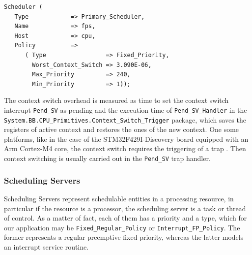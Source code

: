 \documentclass{article}
\begin{document}
\begin{lstlisting}
Scheduler (
   Type            => Primary_Scheduler,
   Name            => fps,
   Host            => cpu,
   Policy          =>
      ( Type                 => Fixed_Priority,
        Worst_Context_Switch => 3.090E-06,
        Max_Priority         => 240,
        Min_Priority         => 1));
\end{lstlisting}

The context switch overhead is measured as time to set the context switch interrupt \texttt{Pend\_SV} as pending and the execution time of \texttt{Pend\_SV\_Handler} in the \texttt{System.BB.CPU\_Primitives.Context\_Switch\_Trigger} package, which saves the registers of active context and restores the ones of the new context. One some platforms, like in the case of the STM32F429I-Discovery board equipped with an Arm Cortex-M4 core, the context switch requires the triggering of a trap \cite{pendsv}. Then context switching is usually carried out in the \texttt{Pend\_SV} trap handler.

\subsubsection{Scheduling Servers}

Scheduling Servers represent schedulable entities in a processing resource, in particular if the resource is a processor, the scheduling server is a task or thread of control. As a matter of fact, each of them has a priority and a type, which for our application may be \texttt{Fixed\_Regular\_Policy} or \texttt{Interrupt\_FP\_Policy}. The former represents a regular preemptive fixed priority, whereas the latter models an interrupt service routine.
\end{document}
